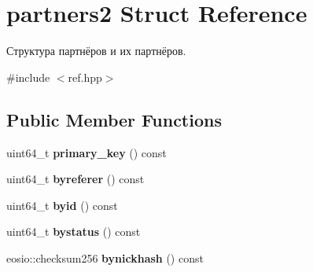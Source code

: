 \hypertarget{structpartners2}{}\section{partners2 Struct Reference}
\label{structpartners2}


Структура партнёров и их партнёров.  




{\ttfamily \#include $<$ref.\+hpp$>$}

\subsection*{Public Member Functions}
\begin{DoxyCompactItemize}
\item 
\mbox{\label{structpartners2_a37a7250a0195969762903785a65b1b8b}} 
uint64\+\_\+t {\bfseries primary\+\_\+key} () const
\item 
\mbox{\label{structpartners2_a208a5ac23d7db6fa02449eea1f6322d2}} 
uint64\+\_\+t {\bfseries byreferer} () const
\item 
\mbox{\label{structpartners2_a92d13db109533760e4bc935062e62b56}} 
uint64\+\_\+t {\bfseries byid} () const
\item 
\mbox{\label{structpartners2_a379e47f8474351bfafe91231cb471826}} 
uint64\+\_\+t {\bfseries bystatus} () const
\item 
\mbox{\label{structpartners2_afa8611fed050f191719f0e4fbaf713a8}} 
eosio\+::checksum256 {\bfseries bynickhash} () const
\end{DoxyCompactItemize}
